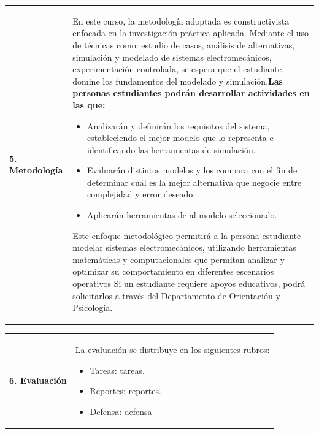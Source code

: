 \documentclass[letterpaper]{article}%
\begin{document}
\begin{tabularx}{\textwidth}{p{3cm}p{13cm}}%
\par\fontsize{12}{14}\selectfont \textbf{\textcolor{parte}{5. Metodología}}&En este curso, la metodología adoptada es constructivista enfocada en la investigación práctica aplicada. Mediante el uso de técnicas como:  estudio de casos, análisis de alternativas, simulación y modelado de sistemas electromecánicos, experimentación controlada, se espera que el estudiante domine los fundamentos del modelado y simulación.\newline\newline \textbf{Las personas estudiantes podrán desarrollar actividades en las que:} \newline\begin{itemize}\item Analizarán y definirán los requisitos del sistema, estableciendo el mejor modelo que lo representa e identificando las herramientas de simulación.\item Evaluarán distintos modelos y los compara con el fin de determinar cuál es la mejor alternativa que negocie entre complejidad y error deseado.\item Aplicarán herramientas de al modelo seleccionado.\end{itemize}\vspace*{2mm}Este enfoque metodológico permitirá a la persona estudiante modelar sistemas electromecánicos, utilizando herramientas matemáticas y computacionales que permitan analizar y optimizar su comportamiento en diferentes escenarios operativos\vspace*{2mm} \newline  Si un estudiante requiere apoyos educativos, podrá solicitarlos a través del Departamento de Orientación y Psicología. \newline \\%
\end{tabularx}%
\vspace*{2mm}%
\newline%
\begin{tabularx}{\textwidth}{p{3cm}p{13cm}}%
\par\fontsize{12}{14}\selectfont \textbf{\textcolor{parte}{6. Evaluación}}&La evaluación se distribuye en los siguientes rubros: \newline \begin{itemize} \item Tareas: tareas. \item Reportes: reportes. \item Defensa: defensa \end{itemize}\\%
\end{tabularx}%
\end{document}
